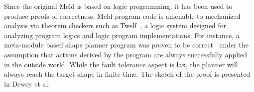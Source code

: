 Since the original Meld is based on logic programming, it has been used to produce proofs of correctness.
Meld program code is amenable to mechanized analysis via theorem checkers such as Twelf~\cite{twelf},
a logic system designed for analyzing program logics and logic program implementations.
For instance, a meta-module based shape planner program was proven to be correct~\cite{dewey-iros08,ashley-rollman-iclp09}
under the assumption that actions derived by the program are always successfully applied in the outside world.
While the fault tolerance aspect is lax, the planner will always reach the target shape in finite time.
The sketch of the proof is presented in Dewey et al.~\cite{dewey-iros08}